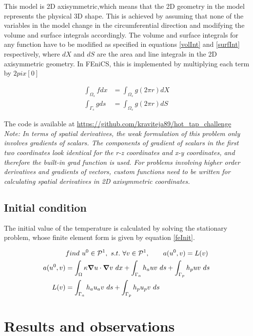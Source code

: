 \documentclass{article}
\begin{document}
This model is 2D axisymmetric,which means that the 2D geometry in the model represents the physical 3D shape. This is achieved by assuming that none of the variables in the model change in the circumferential direction and modifying the volume and surface integrals accordingly. The volume and surface integrals for any function have to be modified as specified in equations \ref{volInt} and \ref{surfInt} respectively, where $dX$ and $dS$ are the area and line integrals in the 2D axisymmetric geometry. In FEniCS, this is implemented by multiplying each term by $2 pi x[0]$

\begin{align}
\int_{\Omega_s} f dx &= \int_{\Omega_s} g (2 \pi r) dX \label{volInt} \\
\int_{\Gamma_s} g ds &= \int_{\Omega_s} g (2 \pi r) dS \label{surfInt}
\end{align}


The code is available at \url{https://github.com/kraviteja89/hot_tap_challenge}\\

\textit{Note: In terms of spatial derivatives, the weak formulation of this problem only involves gradients of scalars. The components of gradient of scalars in the first two coordinates look identical for the r-z coordinates and x-y coordinates, and therefore the built-in grad function is used. For problems involving higher order derivatives and gradients of vectors, custom functions need to be written for calculating spatial derivatives in 2D axisymmetric coordinates.}

\subsection{Initial condition}
The initial value of the temperature is calculated by solving the stationary problem, whose finite element form is given by equation \ref{feInit}.  

\begin{align}
&find ~u^0 \in \mathcal{P}^1,~s.t.~ \forall v \in \mathcal{P}^1, \qquad  a(u^0,v) = L(v) \label{feInit} \\
a(u^0,v) &= \int_\Omega\kappa\grad u \cdot \grad v ~dx  + \int_{\Gamma_a} h_a u v ~ds + \int_{\Gamma_p} h_p u v ~ds \label{initBilinear} \\
L(v) &= \int_{\Gamma_a} h_a u_a v ~ds + \int_{\Gamma_p} h_p u_p v ~ds \label{initLinear}
\end{align}

\section{Results and observations}
\end{document}
